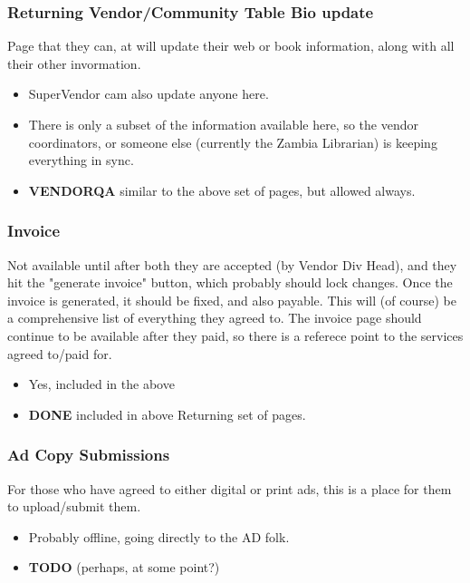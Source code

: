 \documentclass[captions=tablesignature]{scrartcl}
\begin{document}
\subsubsection{Returning Vendor/Community Table Bio update}
\label{sec-3-1-7}
Page that they can, at will update their web or book information,
along with all their other invormation.
\begin{itemize}
\item SuperVendor cam also update anyone here.
\item There is only a subset of the information available here, so
the vendor coordinators, or someone else (currently the Zambia
Librarian) is keeping everything in sync.
\end{itemize}
\begin{itemize}
\item {\bfseries\sffamily VENDORQA} similar to the above set of pages, but allowed always.
\label{sec-3-1-7-1}
\end{itemize}

\subsubsection{Invoice}
\label{sec-3-1-8}
Not available until after both they are accepted (by Vendor
Div Head), and they hit the "generate invoice" button, which
probably should lock changes.  Once the invoice is generated, it
should be fixed, and also payable.
This will (of course) be a comprehensive list of everything they
agreed to.  The invoice page should continue to be available after
they paid, so there is a referece point to the services agreed
to/paid for.
\begin{itemize}
\item Yes, included in the above
\end{itemize}
\begin{itemize}
\item {\bfseries\sffamily DONE} included in above Returning set of pages.
\label{sec-3-1-8-1}
\end{itemize}

\subsubsection{Ad Copy Submissions}
\label{sec-3-1-9}
For those who have agreed to either digital or print ads, this is
a place for them to upload/submit them.
\begin{itemize}
\item Probably offline, going directly to the AD folk.
\end{itemize}
\begin{itemize}
\item {\bfseries\sffamily TODO} (perhaps, at some point?)
\label{sec-3-1-9-1}
\end{itemize}
\end{document}
